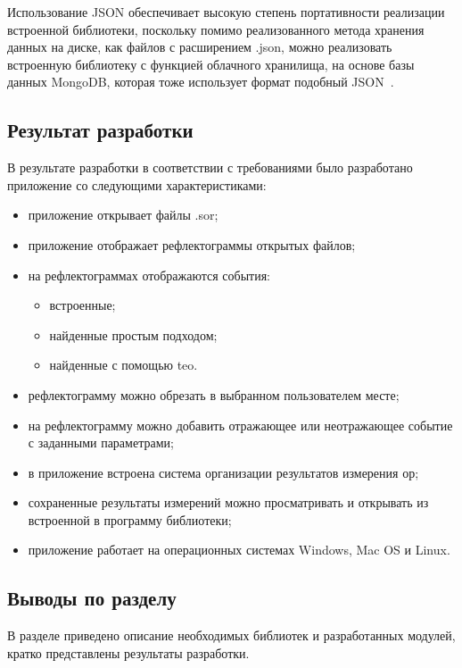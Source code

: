 Использование JSON обеспечивает высокую степень портативности реализации встроенной библиотеки, поскольку помимо реализованного метода хранения данных на диске, как файлов с расширением .json, можно реализовать встроенную библиотеку с функцией облачного хранилища, на основе базы данных MongoDB, которая тоже использует формат подобный JSON~\cite{web:bson}.

\subsection{Результат разработки}

В результате разработки в соответствии с требованиями было разработано приложение со следующими характеристиками:

\begin{itemize}
  \item приложение открывает файлы .sor;
  \item приложение отображает рефлектограммы открытых файлов;
  \item на рефлектограммах отображаются события:
  \begin{itemize}
    \item встроенные;
    \item найденные простым подходом;
    \item найденные с помощью \acrshort{teo}.
  \end{itemize}
  \item рефлектограмму можно обрезать в выбранном пользователем месте;
  \item на рефлектограмму можно добавить отражающее или неотражающее событие с заданными параметрами;
  \item в приложение встроена система организации результатов измерения \acrshort{ор};
  \item сохраненные результаты измерений можно просматривать и открывать из встроенной в программу библиотеки;
  \item приложение работает на операционных системах Windows, Mac OS и Linux.
\end{itemize}

\subsection{Выводы по разделу}

В разделе приведено описание необходимых библиотек и разработанных модулей, кратко представлены результаты разработки.
